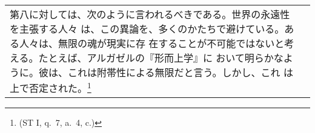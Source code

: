 \documentclass[10pt]{jsarticle} %
\begin{document}
\begin{longtable}{p{21em}p{21em}}
第八に対しては、次のように言われるべきである。世界の永遠性を主張する人々
は、この異論を、多くのかたちで避けている。ある人々は、無限の魂が現実に存
在することが不可能ではないと考える。たとえば、アルガゼルの『形而上学』に
おいて明らかなように。彼は、これは附帯性による無限だと言う。しかし、これ
は上で否定された。\footnote{(ST I, q.~7, a.~4, c.)}

\end{longtable}
\end{document}
